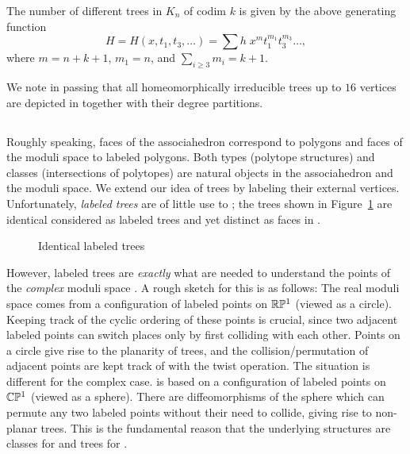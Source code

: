 \documentclass[10pt]{amsart}
\begin{document}
\begin{thm}
The number of different trees in $K_n$ of codim $k$ is given by the above generating function
$$H = H(x, t_1, t_3, \ldots) = \sum h \; x^m t_1^{m_1} t_3^{m_3} \ldots,$$ where $m=n+k+1$, $m_1=n$, and $\displaystyle{\sum_{i \geq 3} m_i = k+1}$.
\end{thm}

\noindent We note in passing that all homeomorphically irreducible trees up to $16$ vertices are depicted in \cite{rw} together with their degree partitions.


\subsection{}
Roughly speaking, faces of the associahedron correspond to polygons and faces of the moduli space to labeled polygons. Both types (polytope structures) and classes (intersections of polytopes) are natural objects in the associahedron and the moduli space.  We extend our idea of trees by labeling their external vertices.  Unfortunately, {\em labeled trees} are of little use to ; the trees shown in Figure~\ref{phylolabel} are identical considered as labeled trees and yet distinct as faces in .
 
\begin{figure}[h]
\caption{Identical labeled trees}
\label{phylolabel}
\end{figure}

However, labeled trees are {\em exactly} what are needed to understand the points of the {\em complex} moduli space .  A rough sketch for this is as follows: The real moduli space  comes from a configuration of labeled points on ${\mathbb R} {\mathbb P}^1$ (viewed as a circle).  Keeping track of the cyclic ordering of these points is crucial, since two adjacent labeled points can switch places only by  first colliding with each other.  Points on a circle give rise to the planarity of trees, and the collision/permutation of adjacent points are kept track of with the twist operation. The situation is different for the complex case.   is based on a configuration of labeled points on ${\mathbb C} {\mathbb P}^1$ (viewed as a sphere).  There are diffeomorphisms of the sphere which can permute any two labeled points without their need to collide, giving rise to non-planar trees. This is the fundamental reason that the underlying structures are classes for  and trees for .
\end{document}
